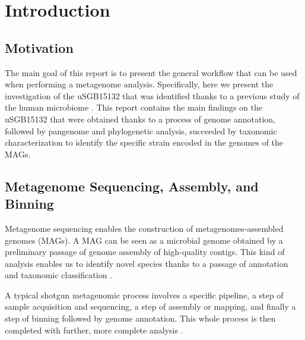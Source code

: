 \documentclass[a4paper,titlepage, oneside]{book}
\begin{document}
\begin{frontespizio}
\Istituzione{}
\Punteggiatura{}
\end{frontespizio}

\tableofcontents

\chapter{Introduction}

\section{Motivation}
The main goal of this report is to present the general workflow that can be used when performing a metagenome analysis. Specifically, here we present the investigation of the uSGB15132 that was identified thanks to a previous study of the human microbiome \cite{SGB2}.
This report contains the main findings on the uSGB15132 that were obtained thanks to a process of genome annotation, followed by pangenome and phylogenetic analysis, succeeded by taxonomic characterization to identify the specific strain encoded in the genomes of the MAGs.



\section{Metagenome Sequencing, Assembly, and Binning}
Metagenome sequencing enables the construction of metagenomes-assembled genomes (MAGs). A MAG can be seen as a microbial genome obtained by a preliminary passage of genome assembly of high-quality contigs. This kind of analysis enables us to identify novel species thanks to a passage of annotation and taxonomic classification \cite{MAG}.

A typical shotgun metagenomic process involves a specific pipeline, a step of sample acquisition and sequencing, a step of assembly or mapping, and finally a step of binning followed by genome annotation. This whole process is then completed with further, more complete analysis \cite{Metagenome}.
\end{document}
